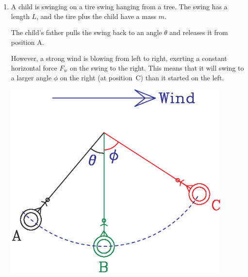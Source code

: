 \documentclass[12pt]{article}
\begin{document}
\Large
\centerline{}
\normalsize
\centerline{}

\begin{enumerate}

\item {	A child is swinging on a tire swing hanging from a tree. The swing has a length $L$, and the 
	tire plus the child have a mass $m$.}
	
	\begin{minipage}{0.6\textwidth}
	
		
		\medskip
		
		
		The child's father pulls the swing back to an angle $\theta$ and releases it from position A.
		
		\medskip
		
		However, a strong wind is blowing from left to right, exerting a constant horizontal force $F_w$ on the swing to the right. This means that it will swing to a larger angle $\phi$ on the right (at position~C) than it started on the left.
		
		\vspace{0.8in}
		
		
	\end{minipage}
	\begin{minipage}{0.4\textwidth}
		\begin{center}
			\includegraphics[width=0.9\textwidth]{swing-crop.pdf}
		\end{center}
	\end{minipage}
	

\end{enumerate}
\end{document}
